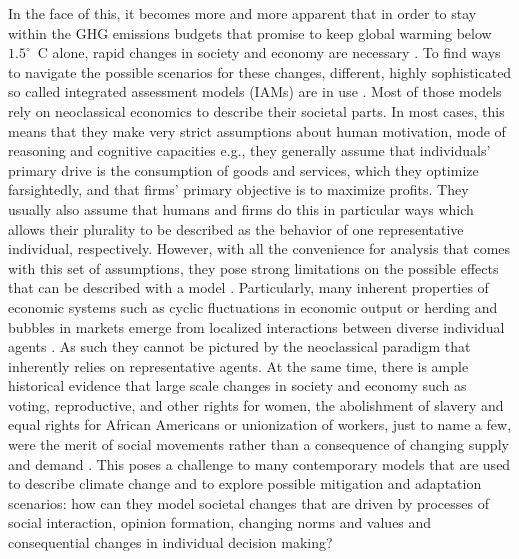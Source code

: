 In the face of this, it becomes more and more apparent that in order to stay within the GHG emissions budgets that promise to keep global warming below $1.5^\circ$~C alone, rapid changes in society and economy are necessary \citep{Rockstrom2017, Geels2017}.
To find ways to navigate the possible scenarios for these changes, different, highly sophisticated so called integrated assessment models (IAMs) are in use \citep{VanVuuren2016}.
Most of those models rely on neoclassical economics to describe their societal parts. In most cases, this means that they make very strict assumptions about human motivation, mode of reasoning and cognitive capacities e.g., they generally assume that individuals' primary drive is the consumption of goods and services, which they optimize farsightedly, and that firms' primary objective is to maximize profits. They usually also assume that humans and firms do this in particular ways which allows their plurality to be described as the behavior of one representative individual, respectively.
However, with all the convenience for analysis that comes with this set of assumptions, they pose strong limitations on the possible effects that can be described with a model \citep{Kirman1992}.
Particularly, many inherent properties of economic systems such as cyclic fluctuations in economic output or herding and bubbles in markets emerge from localized interactions between diverse individual agents \citep{Levin1998, Tesfatsion2003, Anderson2018}. As such they cannot be pictured by the neoclassical paradigm that inherently relies on representative agents. 
At the same time, there is ample historical evidence that large scale changes in society and economy such as voting, reproductive, and other rights for women, the abolishment of slavery and equal rights for African Americans or unionization of workers, just to name a few, were the merit of social movements rather than a consequence of changing supply and demand \citep{Tarrow2011, Tilly2019}. 
This poses a challenge to many contemporary models that are used to describe climate change and to explore possible mitigation and adaptation scenarios: how can they model societal changes that are driven by processes of social interaction, opinion formation, changing norms and values and consequential changes in individual decision making?

